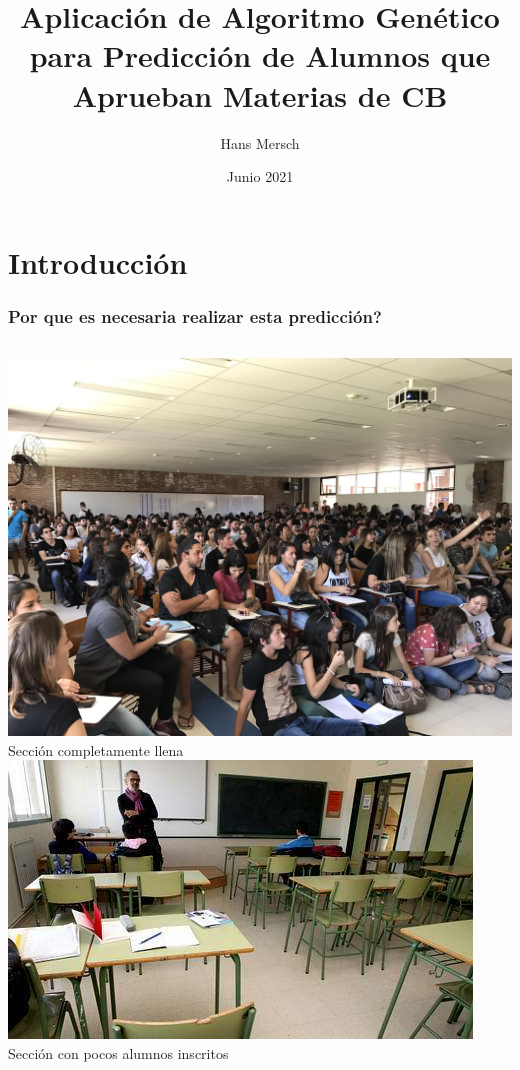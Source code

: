 \documentclass{beamer}
\title{Aplicación de Algoritmo Genético para Predicción de Alumnos que Aprueban Materias de CB}
\author{Hans Mersch }
\date{Junio 2021}
\begin{document}
\begin{frame}
    \titlepage
\end{frame}

\begin{frame}
    \tableofcontents
\end{frame}

\section{Introducción}
\begin{frame}
    \frametitle{Por que es necesaria realizar esta predicción?}
    \pause
    \begin{columns}
    \includegraphics[width=\columnwidth]{Imagenes/C_llena.jpg}
    Sección completamente llena
    \pause
    \includegraphics[width=\columnwidth]{Imagenes/C_vacia.jpg}
    Sección con pocos alumnos inscritos
    \end{columns}
\end{frame}
\end{document}
